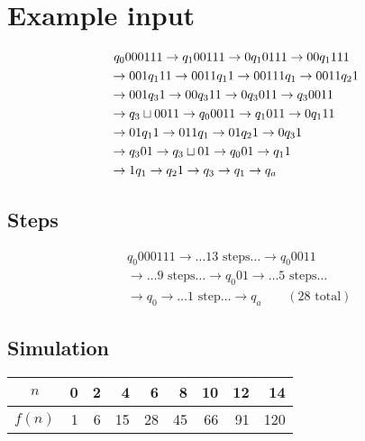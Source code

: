 \documentclass{notes}
\begin{document}
  \section*{Example input}
  
  \begin{align*}
    &\           q_0 000111    \rightarrow  q_1 00111  \rightarrow 0 q_1 0111 \rightarrow 00 q_1 111 \\
    &\rightarrow 001 q_1 11    \rightarrow 0011 q_1 1  \rightarrow 00111 q_1  \rightarrow 0011 q_2 1 \\
    &\rightarrow 001 q_3 1     \rightarrow 00 q_3 11   \rightarrow 0 q_3 011  \rightarrow q_3 0011   \\
    &\rightarrow q_3 \sqcup 0011 \rightarrow q_0 0011    \rightarrow q_1 011    \rightarrow 0 q_1 11   \\
    &\rightarrow 01 q_1 1      \rightarrow 011 q_1     \rightarrow 01 q_2 1   \rightarrow 0 q_3 1    \\
    &\rightarrow q_3 01        \rightarrow q_3 \sqcup 01 \rightarrow q_0 01     \rightarrow q_1 1      \\
    &\rightarrow 1 q_1         \rightarrow q_2 1       \rightarrow q_3        \rightarrow q_1 \rightarrow q_a \\
  \end{align*}

  \subsection*{Steps}
  \begin{align*}
    &q_0 000111 \rightarrow \ldots 13 \textrm{ steps} \ldots \rightarrow q_0 0011 \\
    &\rightarrow \ldots 9 \textrm{ steps} \ldots \rightarrow q_0 01 \rightarrow \ldots 5 \textrm{ steps} \ldots\\
    & \rightarrow q_0 \rightarrow \ldots 1 \textrm{ step} \ldots \rightarrow q_a \qquad (28 \textrm{ total})
  \end{align*}
  
  
    \subsection*{Simulation}
    
    \begin{center}
    \begin{tabular}{crrrrrrrr}
      \toprule
      $n$   & 0 &  2 &  4 &  6 &  8 & 10 & 12 &  14 \\
      \midrule
      $f(n)$ & 1 &  6 & 15 & 28 & 45 & 66 & 91 & 120 \\
      \bottomrule
    \end{tabular}
    \end{center}
    
\end{document}
